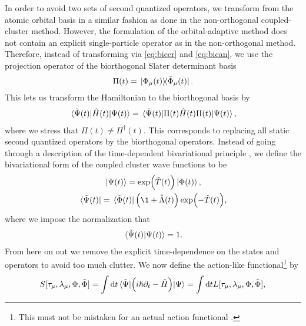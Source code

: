         In order to avoid two sets of second quantized operators, we
        transform from the atomic orbital basis in a similar fashion as done
        in the non-orthogonal coupled-cluster method.
        However, the formulation of the orbital-adaptive method does not
        contain an explicit single-particle operator as in the
        non-orthogonal method.
        Therefore, instead of transforming via \autoref{eq:biccr} and
        \autoref{eq:bican}, we use the projection operator of the
        biorthogonal Slater determinant basis \cite{kvaal2012ab}
        \begin{align}
            \Pi(t)
            = \dyad*{\slat_{\mu}(t)}{\tilde{\slat}_{\mu}(t)}.
        \end{align}
        This lets us transform the Hamiltonian to the biorthogonal basis by
        \begin{align}
            \mel*{\tilde{\Psi}(t)}{\hat{H}(t)}{\Psi(t)}
            =
            \mel*{\tilde{\Psi}(t)}{\Pi(t)\hat{H}(t)\Pi(t)}{\Psi(t)},
        \end{align}
        where we stress that $\Pi(t) \neq \Pi^{\dagger}(t)$.  This
        corresponds to replacing all static second quantized operators by
        the biorthogonal operators.
        Instead of going through a description of the time-dependent
        bivariational principle \cite{kvaal2012ab, arponen1983311}, we
        define the bivariational form of the coupled cluster wave functions
        to be
        \begin{gather}
            \ket*{\Psi(t)} = \exp(\clust(t))\ket*{\slat(t)}, \\
            \bra*{\tilde{\Psi}(t)}
            = \bra*{\tilde{\slat}(t)}\para{\1 + \clustl(t)}
            \exp(-\clust(t)),
        \end{gather}
        where we impose the normalization that
        \begin{align}
            \braket*{\tilde{\Psi}(t)}{\Psi(t)} = 1.
        \end{align}
        From here on out we remove the explicit time-dependence on the
        states and operators to avoid too much clutter.
        We now define the action-like functional\footnote{%
            This must not be mistaken for an actual action functional
            \cite{arponen1983311}.
        } by \cite{kvaal2012ab, arponen1983311}
        \begin{align}
            S[\tau_{\mu}, \lambda_{\mu}, \Phi, \tilde{\Phi}]
            =
            \int \dd t
            \mel*{\tilde{\Psi}}{
                \left( 
                    i\hslash\partial_t - \hat{H}
                 \right)
            }{\Psi}
            =
            \int \dd t
            L[\tau_{\mu}, \lambda_{\mu}, \Phi, \tilde{\Phi}],
            \label{eq:oacc-action-functional}
        \end{align}
